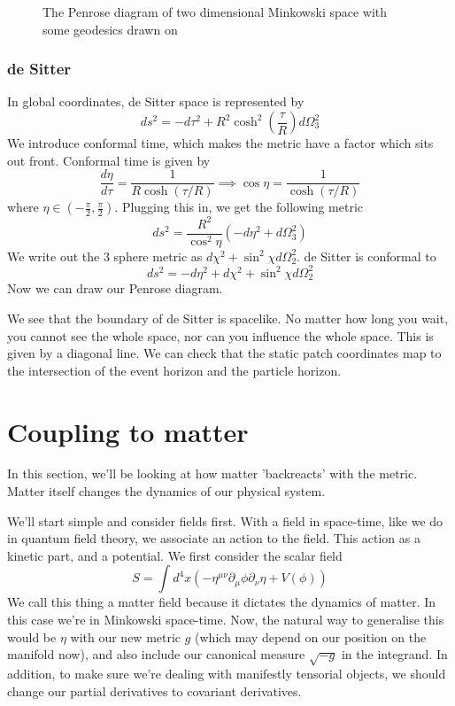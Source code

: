 \begin{figure}[h]
	\centering
	
	\caption{The Penrose diagram of two dimensional Minkowski 
	space with some geodesics drawn on}
	\label{fig:p_2}
\end{figure}

\subsubsection{de Sitter} 
In global coordinates, de Sitter space 
is represented by 
\[
 ds ^ 2 = - d \tau ^ 2 + R ^ 2 \cosh ^ 2 \left(  \frac{ \tau }{ R }  \right)  d \Omega_ 3 ^ 2 
\] We introduce conformal time, 
which makes the metric have a factor which sits out front.
Conformal time is given by 
\[
	\frac{ d \eta }{ d \tau }  = \frac{1}{ R \cosh \left(  \tau / R  \right)  } 
	\implies \cos \eta = \frac{1}{\cosh \left(  \tau /  R  \right) }
\] where $ \eta \in ( - \frac{\pi}{2 } , \frac{\pi}{2 } ) $. 
Plugging this in, 
we get the following metric 
\[
	ds ^ 2= \frac{R ^ 2 }{ \cos^ 2 \eta } \left(  
	 - d \eta ^ 2 + d \Omega_ 3 ^ 2 \right)  
\] We write out the 3 sphere metric as $ d \chi ^ 2  + \sin ^ 2 \chi d \Omega _ 2 ^2 $. 
de Sitter is conformal to 
\[
 ds ^ 2 = - d \eta ^ 2 + d \chi ^ 2 + \sin ^ 2 \chi  d \Omega_2 ^ 2 
\] Now we can draw our Penrose diagram. 

We see that the boundary of de Sitter 
is spacelike. 
No matter how long you wait, you cannot 
see the whole space, nor can you influence 
the whole space. This is given by a diagonal line. 
We can check that the static patch coordinates map to 
the intersection of the event horizon and the particle horizon.

\pagebreak 
\section{Coupling to matter} 
In this section, we'll be looking at how 
matter 'backreacts' with the metric. Matter itself 
changes the dynamics of our physical system.

We'll start simple and consider fields first. 
With a field in space-time, like we do in quantum field theory, 
we associate an action to the field. This action 
as a kinetic part, and a potential. 
We first consider the scalar field 
\[
	S = \int d ^ 4 x \left(  - \eta ^{ \mu \nu } \partial  _ \mu \phi \partial  _ \nu \eta 
	+ V ( \phi ) \right)   
\] We call this thing a matter 
field because it dictates the dynamics of matter. 
In this case we're in Minkowski space-time. 
Now, the natural way to generalise this would be $ \eta $ with 
our new metric $ g $ (which may depend on our position on the manifold now), 
and also include our canonical measure $ \sqrt{ - g }  $ in the integrand. 
In addition, to make sure we're dealing with manifestly tensorial 
objects, we should change our partial derivatives 
to covariant derivatives. 

